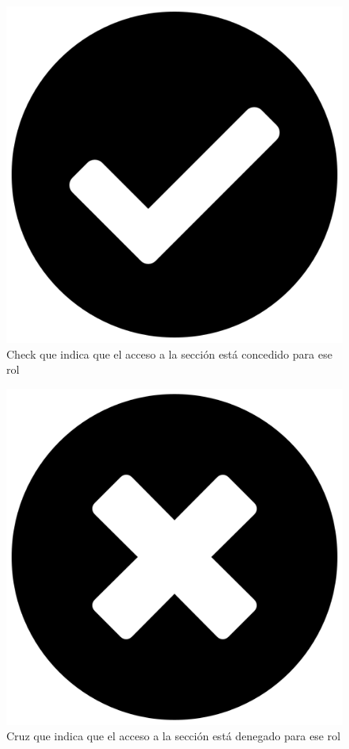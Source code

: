 \documentclass[10pt,a4paper]{article}
\begin{document}
\pagebreak
\begin{figure}
  \includegraphics[width=\linewidth]{check.png}
  \caption{Check que indica que el acceso a la sección está concedido para ese rol}
  \label{fig:check}
\end{figure}

\begin{figure}
  \includegraphics[width=\linewidth]{times.png}
  \caption{Cruz que indica que el acceso a la sección está denegado para ese rol}
  \label{fig:times}
\end{figure}
\end{document}
